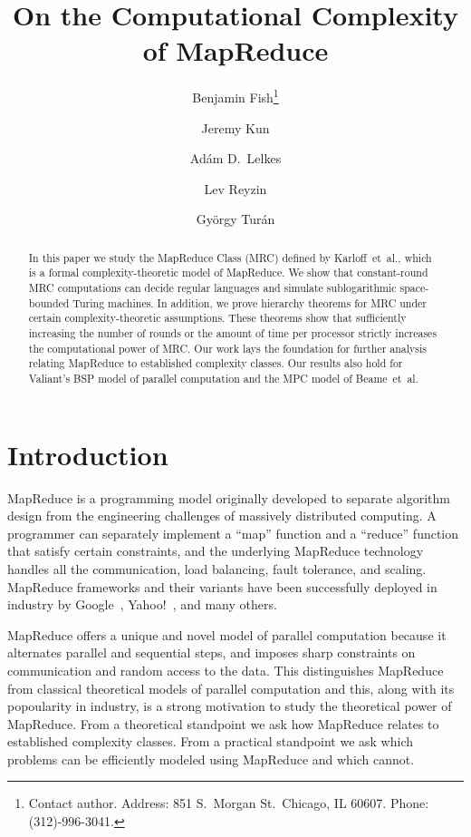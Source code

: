 \documentclass{llncs}
\title{On the Computational Complexity of MapReduce
}
\date{}
\author{Benjamin Fish\inst{1}\thanks{Contact author. Address: 851 S.\ Morgan St.\ Chicago, IL 60607. Phone:  (312)-996-3041.} \and
Jeremy Kun\inst{1} \and
Ad\'am D.\ Lelkes\inst{1} \and
Lev Reyzin\inst{1} \and
Gy\"orgy Tur\'an\inst{1,2}}
\institute{
Department of Mathematics, Statistics, and Computer Science,\\ University of Illinois at Chicago
\\ \email{\{bfish3,jkun2,alelke2,lreyzin,gyt\}@uic.edu}
\and
MTA-SZTE Research Group on Artificial Intelligence, Szeged
}
\begin{document}
\maketitle

\begin{abstract} 

In this paper we study the MapReduce Class (MRC) defined by Karloff~et~al.,
which is a formal complexity-theoretic model of MapReduce. We show that
constant-round MRC computations can decide regular languages and simulate
sublogarithmic space-bounded Turing machines. In addition, we prove hierarchy
theorems for MRC under certain complexity-theoretic assumptions. These theorems
show that sufficiently increasing the number of rounds or the amount of time
per processor strictly increases the computational power of MRC. Our work lays
the foundation for further analysis relating MapReduce to established
complexity classes. Our results also hold for Valiant's BSP model of parallel
computation and the MPC model of Beame~et~al. 

\end{abstract}
\thispagestyle{empty}
\newpage
\setcounter{page}{1}
\section{Introduction}

MapReduce is a programming model originally developed to separate algorithm
design from the engineering challenges of massively distributed computing. A
programmer can separately implement a ``map'' function and a ``reduce''
function that satisfy certain constraints, and the underlying MapReduce
technology handles all the communication, load balancing, fault tolerance, and
scaling. MapReduce frameworks and their variants have been successfully
deployed in industry by Google~\cite{DeanG08}, Yahoo!~\cite{ShvachkoKRC10}, and
many others.

MapReduce offers a unique and novel model of parallel computation because it
alternates parallel and sequential steps, and imposes sharp constraints on
communication and random access to the data. This distinguishes MapReduce from
classical theoretical models of parallel computation and this, along with its
popoularity in industry, is a strong motivation to study the theoretical power
of MapReduce. From a theoretical standpoint we ask how MapReduce relates to
established complexity classes. From a practical standpoint we ask which
problems can be efficiently modeled using MapReduce and which cannot.
\end{document}
